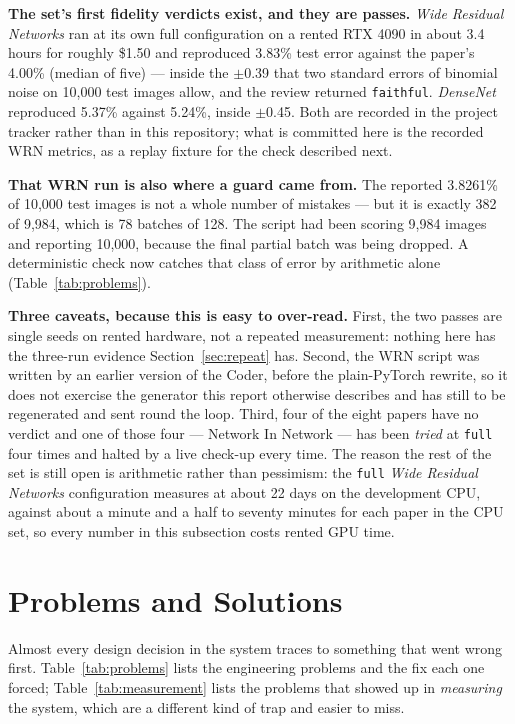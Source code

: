 \documentclass[10pt,twocolumn]{article}
\begin{document}
\textbf{The set's first fidelity verdicts exist, and they are passes.} \emph{Wide Residual
Networks} ran at its own full configuration on a rented RTX 4090 in about 3.4 hours for roughly
\$1.50 and reproduced 3.83\% test error against the paper's 4.00\% (median of five) --- inside
the $\pm$0.39 that two standard errors of binomial noise on 10{,}000 test images allow, and the
review returned \texttt{faithful}. \emph{DenseNet} reproduced 5.37\% against 5.24\%, inside
$\pm$0.45. Both are recorded in the project tracker rather than in this repository; what is
committed here is the recorded WRN metrics, as a replay fixture for the check described next.

\textbf{That WRN run is also where a guard came from.} The reported 3.8261\% of 10{,}000 test
images is not a whole number of mistakes --- but it is exactly 382 of 9{,}984, which is 78
batches of 128. The script had been scoring 9{,}984 images and reporting 10{,}000, because the
final partial batch was being dropped. A deterministic check now catches that class of error by
arithmetic alone (Table~\ref{tab:problems}).

\textbf{Three caveats, because this is easy to over-read.} First, the two passes are single
seeds on rented hardware, not a repeated measurement: nothing here has the three-run evidence
Section~\ref{sec:repeat} has. Second, the WRN script was written by an earlier version of the
Coder, before the plain-PyTorch rewrite, so it does not exercise the generator this report
otherwise describes and has still to be regenerated and sent round the loop. Third, four of the
eight papers have no verdict and one of those four --- Network In Network --- has been
\emph{tried} at \texttt{full} four times and halted by a live check-up every time. The reason the
rest of the set is still open is arithmetic rather than pessimism: the \texttt{full} \emph{Wide
Residual Networks} configuration measures at about 22 days on the development CPU, against about
a minute and a half to seventy minutes for each paper in the CPU set, so every number in this
subsection costs rented GPU time.

\section{Problems and Solutions}
\label{sec:problems}

Almost every design decision in the system traces to something that went wrong first.
Table~\ref{tab:problems} lists the engineering problems and the fix each one forced;
Table~\ref{tab:measurement} lists the problems that showed up in \emph{measuring} the system,
which are a different kind of trap and easier to miss.
\end{document}
